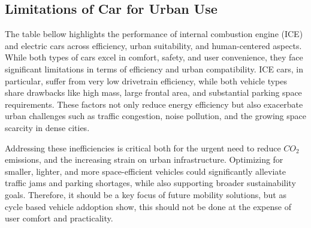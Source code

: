 \newpage 

\subsection{Limitations of Car for Urban Use}

The table bellow highlights the performance of internal combustion engine (ICE) and electric cars across efficiency, urban suitability, and human-centered aspects. While both types of cars excel in comfort, safety, and user convenience, they face significant limitations in terms of efficiency and urban compatibility. ICE cars, in particular, suffer from very low drivetrain efficiency, while both vehicle types share drawbacks like high mass, large frontal area, and substantial parking space requirements. These factors not only reduce energy efficiency but also exacerbate urban challenges such as traffic congestion, noise pollution, and the growing space scarcity in dense cities.

Addressing these inefficiencies is critical both for the urgent need to reduce $CO_2$ emissions, and the increasing strain on urban infrastructure. Optimizing for smaller, lighter, and more space-efficient vehicles could significantly alleviate traffic jams and parking shortages, while also supporting broader sustainability goals. Therefore, it should be a key focus of future mobility solutions, but as cycle based vehicle addoption show, this should not be done at the expense of user comfort and practicality.

